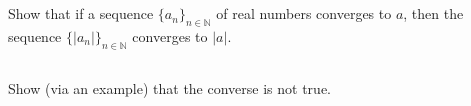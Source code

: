 \documentclass[11pt,letterpaper]{article}
\begin{document}
\section{}
\subsection{} Show that if a sequence $\{a_n\}_{n\in\mathbb{N}}$ of real numbers converges to $a$, then the sequence $\{|a_n|\}_{n\in\mathbb{N}}$ converges to $|a|$. 
\subsection{} Show (via an example) that the converse is not true.


\vfill
\printbibliography
\end{document}
